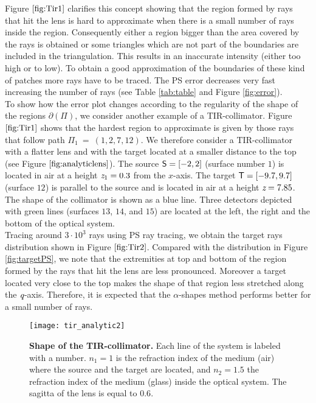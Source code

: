 Figure $\ref{fig:Tir1}$ clarifies this concept showing that the region formed by rays that hit the lens is hard to approximate when there is a small number of rays inside the region. Consequently either a region bigger than the area covered by the rays is obtained or some triangles which are not part of the boundaries are included in the triangulation. This results in an inaccurate intensity (either too high or to low). To obtain a good approximation of the boundaries of these kind of patches more rays have to be traced. The PS error decreases very fast increasing the number of rays (see Table
 \ref{tab:table} and Figure \ref{fig:error}).
 \\\indent To show how the error plot changes according to the regularity of the shape of the regions $\partial$$(\Pi)$, we consider another example of a TIR-collimator.
 Figure $\ref{fig:Tir1}$ shows that the hardest region to approximate is given by those rays that follow path $\Pi_1 ~=~ (1,2,7,12)$.
 We therefore consider a TIR-collimator with a flatter lens and with the target located at a smaller distance to the top (see Figure $\ref{fig:analyticlens}$). 
The source $\textsf{S}= [-2,2]$ (surface number $1$) is located in air at a height $\textit{z}_1 = 0.3$ from the $x$-axis.
       The target $\textsf{T}= [-9.7, 9.7]$ (surface $12$) is parallel to the source and is located in air at a height $ \textit{z}= 7.85$.
       The shape of the collimator is shown as a blue line.
       Three detectors depicted with green lines (surfaces $13$, $14$, and $15$) are located at the left, the right and the bottom of the optical system.
 \\ \indent Tracing around $3\cdot10^3$ rays using PS ray tracing, we obtain the target rays distribution shown in Figure $\ref{fig:Tir2}$. 
Compared with the distribution in Figure \ref{fig:targetPS}, we note that the extremities at top and bottom of the region formed by the rays that hit the lens are less pronounced.
Moreover a target located very close to the top makes the shape of that region less stretched along the $\textit{q}$-axis.
Therefore, it is expected that the $\alpha$-shapes method performs better for a small number of rays.
\begin{figure}[h]
  \begin{center}
  \texttt{[image: tir\_analytic2]}
   \end{center}
    \caption{\textbf{Shape of the TIR-collimator.} Each line of the system is labeled with a number.
       $n_1 = 1$ is the refraction index of the medium (air) where the source and the target are located, and
       $n_2 = 1.5 $ the refraction index of the medium (glass) inside the optical system. The sagitta of the lens is equal to $0.6$.}
 \label{fig:analyticlens}
\end{figure}
